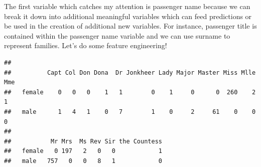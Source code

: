 \documentclass[]{book}
\newenvironment{Shaded}{\begin{snugshade}}{\end{snugshade}}
\newcommand{\KeywordTok}[1]{\textcolor[rgb]{0.13,0.29,0.53}{\textbf{#1}}}
\newcommand{\CharTok}[1]{\textcolor[rgb]{0.31,0.60,0.02}{#1}}
\newcommand{\StringTok}[1]{\textcolor[rgb]{0.31,0.60,0.02}{#1}}
\newcommand{\CommentTok}[1]{\textcolor[rgb]{0.56,0.35,0.01}{\textit{#1}}}
\newcommand{\OperatorTok}[1]{\textcolor[rgb]{0.81,0.36,0.00}{\textbf{#1}}}
\newcommand{\NormalTok}[1]{#1}
\theoremstyle{definition}
\theoremstyle{definition}
\theoremstyle{definition}
\theoremstyle{remark}
\begin{document}
The first variable which catches my attention is passenger name because
we can break it down into additional meaningful variables which can feed
predictions or be used in the creation of additional new variables. For
instance, passenger title is contained within the passenger name
variable and we can use surname to represent families. Let's do some
feature engineering!

\begin{Shaded}
\end{Shaded}

\begin{verbatim}
##         
##          Capt Col Don Dona  Dr Jonkheer Lady Major Master Miss Mlle Mme
##   female    0   0   0    1   1        0    1     0      0  260    2   1
##   male      1   4   1    0   7        1    0     2     61    0    0   0
##         
##           Mr Mrs  Ms Rev Sir the Countess
##   female   0 197   2   0   0            1
##   male   757   0   0   8   1            0
\end{verbatim}
\end{document}
